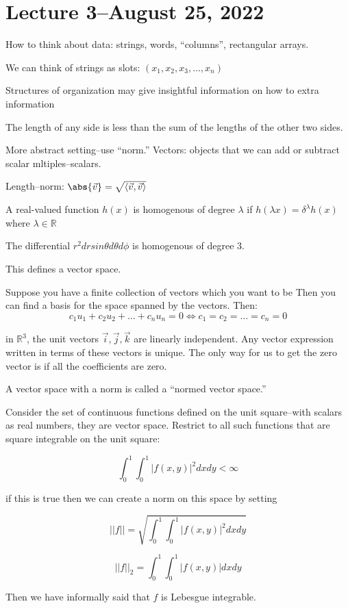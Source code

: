 \documentclass{scrreprt}
\begin{document}
\section{Lecture 3--August 25, 2022}

How to think about data: strings, words, ``columns'', rectangular arrays.

We can think of strings as slots: $(x_1, x_2, x_3, \ldots, x_n)$

Structures of organization may give insightful information on how to extra information

\begin{definition}
	The length of any side is less than the sum of the lengths of the other two sides.
\end{definition}

More abstract setting--use ``norm.'' Vectors: objects that we can add or subtract scalar mltiples--scalars.

Length--norm: $\abs{\vec{v}}=\sqrt{\langle \vec{v}, \vec{v}\rangle}$

\begin{definition}[Homogenous]
	A real-valued function $h(x)$ is homogenous of degree $\lambda$
	if $h(\lambda x)=\delta^\lambda h(x)$ where $\lambda \in \mathbb{R}$

	The differential $r^2drsin\theta d\theta d\phi$ is homogenous of degree $3$.

	This defines a vector space.
\end{definition}

\begin{remark}
	Suppose you have a finite collection of vectors which you want to be 
	Then you can find a basis for the space spanned by the vectors. Then:
	\[
		c_1u_1 + c_2u_2 + \ldots + c_nu_n = 0 \Leftrightarrow c_1=c_2=\ldots=c_n=0
	\]

	in $\mathbb{R}^3$, the unit vectors $\vec{i}, \vec{j}, \vec{k}$ are linearly independent.
	Any vector expression written in terms of these vectors is unique. The only way
	for us to get the zero vector is if all the coefficients are zero.

\end{remark}

A vector space with a norm is called a ``normed vector space.''

\begin{example}
	Consider the set of continuous functions defined on the unit square--with scalars
	as real numbers, they are vector space. Restrict to all such functions that are
	square integrable on the unit square:

	\[
		\int_0^1\int_0^1|f(x,y)|^2dx dy < \infty
	\]

	if this is true then we can create a norm on this space by setting 

	\[
		||f|| = \sqrt{\int_0^1\int_0^1|f(x,y)|^2dxdy}
	\]

	\[
		||f||_2 = \int_0^1\int_0^1|f(x,y)|dxdy
	\]

	Then we have informally said that $f$ is Lebesgue integrable.
\end{example}
\end{document}
